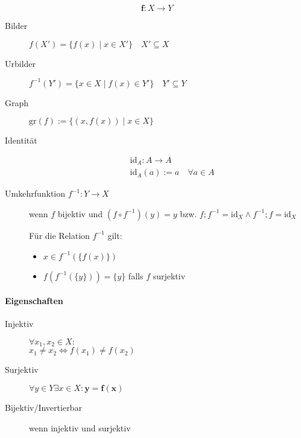$$\mathbf{f}: X \rightarrow Y$$

\begin{description}
  \item [Bilder] $f(X') = \{ f(x) \mid x \in X' \} \quad X' \subseteq X$
  \item [Urbilder] $f^{-1}(Y') = \{ x \in X \mid f(x) \in Y' \} \quad Y' \subseteq Y$
\end{description}

\begin{description}
  \item [Graph]
        $\text{gr} (f) := \{ (x, f(x)) \mid x \in X \}$

  \item [Identität]
        \begin{align*}
           & \text{id}_A: A \rightarrow A              \\
           & \text{id}_A(a) := a \quad \forall a \in A
        \end{align*}

  \item [Umkehrfunktion $f^{-1}: Y \rightarrow X$]
        wenn $f$ bijektiv und $(f \circ f^{-1}) (y) = y$ bzw. $f;f^{-1} = \text{id}_X \land f^{-1};f = \text{id}_X$

        Für die Relation $f^{-1}$ gilt:

        \begin{itemize}
          \item $x \in f^{-1}(\{ f(x) \})$
          \item $f(f^{-1}(\{ y \})) = \{ y \}$ falls $f$ surjektiv
        \end{itemize}
\end{description}

\paragraph{Eigenschaften}

\begin{mzImportant}
  \begin{description}
    \item [Injektiv]
          $\forall x_1, x_2 \in X:$ \\
          $x_1 \boldsymbol{\neq} x_2 \Leftrightarrow f(x_1) \boldsymbol{\neq} f(x_2)$

    \item [Surjektiv]
          $\forall y \in Y \exists x \in X: \mathbf{y = f(x)}$

    \item [Bijektiv/Invertierbar]
          wenn injektiv und surjektiv
  \end{description}
\end{mzImportant}

